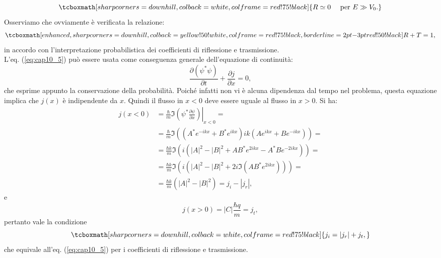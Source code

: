 	\begin{equation}
		\tcboxmath[sharp corners=downhill, colback=white, colframe=red!75!black]{
			R\simeq 0\quad  \textrm{ per } E\gg V_0.
			}
	\end{equation}
Osserviamo che ovviamente è verificata la relazione:
	\begin{equation}
		\tcboxmath[enhanced, sharp corners=downhill, colback=yellow!50!white, colframe=red!75!black, borderline={2pt}{-3pt}{red!50!black}]{
			R+T=1,
			}
	\label{eq:cap10_5}
	\end{equation}
in accordo con l'interpretazione probabilistica dei coefficienti di riflessione e trasmissione.\\

L'eq. (\ref{eq:cap10_5}) può essere usata come conseguenza generale dell'equazione di continuità:
	\begin{equation}
		\frac{\partial \left(\psi^* \psi \right)}{\partial t}+ \frac{\partial j}{\partial x}=0,
	\end{equation}
che esprime appunto la conservazione della probabilità. Poiché infatti non vi è alcuna dipendenza dal tempo nel problema, questa equazione implica che $j(x)$ è indipendente da $x$. Quindi il flusso in $x<0$ deve essere uguale al flusso in $x>0$. Si ha:
	\begin{align}
		j\left( x<0 \right) &= \frac{\hbar}{m} \Im \left. \left( \psi ^* \frac{\partial \psi}{\partial x} \right) \right| _{x<0} = \nonumber \\
		&= \frac{\hbar}{m} \Im \left( \left( A^* e^{-ikx} + B^* e^{ikx}\right)ik \left( A e^{ikx} + B e^{-ikx}\right)\right)= \nonumber \\
		&=\frac{\hbar k}{m} \Im \left( i\left( |A|^2 - |B|^2 +AB^* e^{2ikx}- A^* B e^{-2ikx}\right)\right)= \nonumber \\
		&=\frac{\hbar k}{m} \Im \left( i\left( |A|^2 - |B|^2 +2i \Im \left( A B^* e^{2ikx}\right) \right)\right)= \nonumber \\
		&= \frac{\hbar k}{m}\left( |A|^2 - |B|^2\right)= j_i- |j_r|,
\end{align}
e
	\begin{equation}
		j\left( x>0 \right) = |C| \frac{\hbar q}{m}= j_t,
	\end{equation}
pertanto vale la condizione
	\begin{equation}
		\tcboxmath[sharp corners=downhill, colback=white, colframe=red!75!black]{
			j_i = |j_r|+ j_t,
			}
	\end{equation}
che equivale all'eq. (\ref{eq:cap10_5}) per i coefficienti di riflessione e trasmissione.\\

